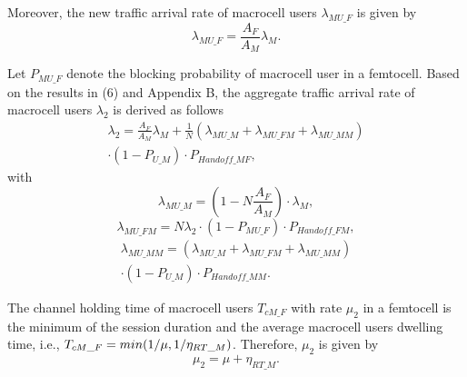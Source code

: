 \documentclass[10pt,final,journal,letterpaper,twoside,twocolumn]{IEEEtran}
\begin{document}
Moreover, the new traffic arrival rate of macrocell users ${\lambda _{MU\_F}}$ is given by
\begin{equation}
{\lambda _{MU\_F}} = \frac{{{A_F}}}{{{A_M}}}{\lambda _M}.
\label{eq9}
\tag{6}
\end{equation}

Let ${P_{MU\_F}}$ denote the blocking probability of macrocell user in a
femtocell. Based on the results in (6) and Appendix B, the aggregate traffic arrival
rate of macrocell users ${\lambda _2}$ is derived as follows
\begin{equation}
\begin{split}
{\lambda _2} = \frac{{{A_F}}}{{{A_M}}}{\lambda _M} + \frac{1}{N}\left( {{\lambda _{MU\_M}} + {\lambda _{MU\_FM}} + {\lambda _{MU\_MM}}} \right) \\
\cdot \left( {1 - {P_{U\_M}}} \right) \cdot {P_{Handoff\_MF}},
\end{split}
\label{eq10}
\tag{7a}
\end{equation}
with
\begin{equation}
{\lambda _{MU\_M}} = \left( {1 - N\frac{{{A_F}}}{{{A_M}}}} \right) \cdot {\lambda _M},
\label{eq11}
\tag{7b}
\end{equation}
\begin{equation}
{\lambda _{MU\_FM}} = N{\lambda _2} \cdot \left( {1 - {P_{MU\_F}}} \right) \cdot {P_{Handoff\_FM}},
\label{eq12}
\tag{7c}
\end{equation}
\begin{equation}
\begin{split}
{\lambda _{MU\_MM}} = \left( {{\lambda _{MU\_M}} + {\lambda _{MU\_FM}} + {\lambda _{MU\_MM}}} \right) \\
\cdot \left( {1 - {P_{U\_M}}} \right) \cdot {P_{Handoff\_MM}}.
\end{split}
\label{eq13}
\tag{7d}
\end{equation}

The channel holding time of macrocell users ${T_{cM\_F}}$ with rate ${\mu _2}$ in a femtocell is the minimum of the session duration and the average macrocell users dwelling time, i.e., ${T_{cM\_F}} = min({1 \mathord{\left/{\vphantom {1 \mu }} \right. \kern-\nulldelimiterspace} \mu },{1 \mathord{\left/ {\vphantom {1 {{\eta _{RT\_F}}}}} \right.\kern-\nulldelimiterspace} {{\eta _{RT\_M}}}})$. Therefore, ${\mu _2}$ is given by \cite{Shun05}
\begin{equation}
{\mu _2} = \mu  + {\eta _{RT\_M}}.
\label{eq14}
\tag{8}
\end{equation}
\end{document}
